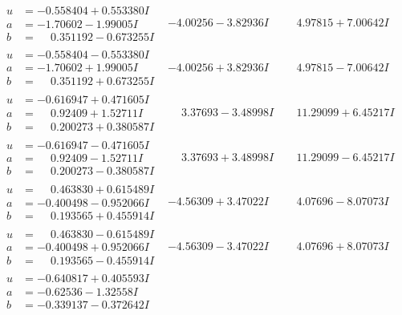 \documentclass[1p]{elsarticle_modified}
\theoremstyle{definition}
\begin{document}
$$\begin{array}{c|c|c}
\begin{aligned}
u &= -0.558404 + 0.553380 I \\
a &= -1.70602 - 1.99005 I \\
b &= \phantom{-}0.351192 - 0.673255 I\end{aligned}
 & -4.00256 - 3.82936 I & \phantom{-}4.97815 + 7.00642 I \\ \hline\begin{aligned}
u &= -0.558404 - 0.553380 I \\
a &= -1.70602 + 1.99005 I \\
b &= \phantom{-}0.351192 + 0.673255 I\end{aligned}
 & -4.00256 + 3.82936 I & \phantom{-}4.97815 - 7.00642 I \\ \hline\begin{aligned}
u &= -0.616947 + 0.471605 I \\
a &= \phantom{-}0.92409 + 1.52711 I \\
b &= \phantom{-}0.200273 + 0.380587 I\end{aligned}
 & \phantom{-}3.37693 - 3.48998 I & \phantom{-}11.29099 + 6.45217 I \\ \hline\begin{aligned}
u &= -0.616947 - 0.471605 I \\
a &= \phantom{-}0.92409 - 1.52711 I \\
b &= \phantom{-}0.200273 - 0.380587 I\end{aligned}
 & \phantom{-}3.37693 + 3.48998 I & \phantom{-}11.29099 - 6.45217 I \\ \hline\begin{aligned}
u &= \phantom{-}0.463830 + 0.615489 I \\
a &= -0.400498 - 0.952066 I \\
b &= \phantom{-}0.193565 + 0.455914 I\end{aligned}
 & -4.56309 + 3.47022 I & \phantom{-}4.07696 - 8.07073 I \\ \hline\begin{aligned}
u &= \phantom{-}0.463830 - 0.615489 I \\
a &= -0.400498 + 0.952066 I \\
b &= \phantom{-}0.193565 - 0.455914 I\end{aligned}
 & -4.56309 - 3.47022 I & \phantom{-}4.07696 + 8.07073 I \\ \hline\begin{aligned}
u &= -0.640817 + 0.405593 I \\
a &= -0.62536 - 1.32558 I \\
b &= -0.339137 - 0.372642 I\end{aligned}

\end{array}$$
\end{document}

